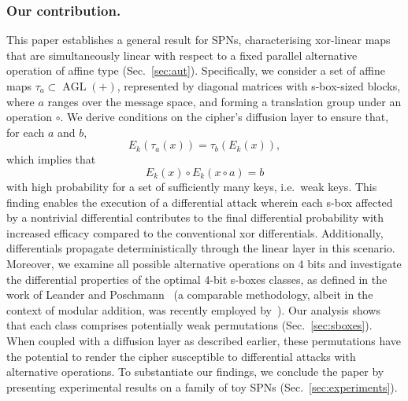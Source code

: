 \documentclass[runningheads,a4paper,english]{llncs}
\DeclareMathOperator{\AGL}{AGL}
\begin{document}
\subsubsection*{Our contribution.}
This paper establishes a general result for SPNs, characterising xor-linear maps that are simultaneously linear with respect to a fixed parallel alternative operation of affine type (Sec.~\ref{sec:aut}). Specifically, we consider a set of affine maps ${\tau_a} \subset \AGL(+)$, represented by diagonal matrices with s-box-sized blocks, where $a$ ranges over the message space, and forming a translation group under an operation $\circ$. We derive conditions on the cipher’s diffusion layer to ensure that, for each $a$ and $b$,
\[
 E_k(\tau_a(x)) = \tau_b(E_k(x)),
\]  
which implies that
\[
E_k(x)\circ E_k(x\circ a) = b
\]
with high probability for a set of sufficiently many keys, i.e.\ weak keys.
This finding enables the execution of a differential attack wherein each s-box affected by a nontrivial differential contributes to the final differential probability with increased efficacy compared to the conventional xor differentials. Additionally, differentials propagate deterministically through the linear layer in this scenario.
Moreover, we examine all possible alternative operations on 4 bits and investigate the differential properties of the optimal 4-bit s-boxes classes, as defined in the work of Leander and Poschmann~\cite{leander2007classification} (a comparable methodology, albeit in the context of modular addition, was recently employed by~\citet{zajac2020cryptographic}). Our analysis shows that each class comprises potentially weak permutations (Sec.~\ref{sec:sboxes}). When coupled with a diffusion layer as described earlier, these permutations have the potential to render the cipher susceptible to differential attacks with alternative operations. To substantiate our findings, we conclude the paper by presenting experimental results on a family of toy SPNs (Sec.~\ref{sec:experiments}).
\end{document}
